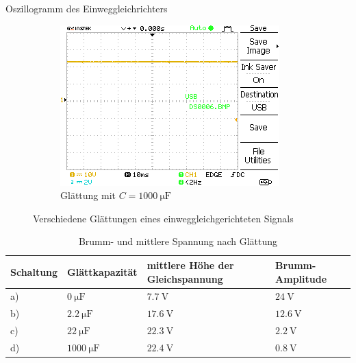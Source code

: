 \documentclass{article}
\theoremstyle{definition}
\begin{document}
\begin{aufgabe}{Oszillogramm des Einweggleichrichters}
\begin{figure}[H]
\begin{subfigure}[b]{0.49 \textwidth}
            \includegraphics[width=\textwidth]{MesswerteVersuch2/DS0006.png}
            \caption{Glättung mit $C = \SI{1000}{\micro\farad}$}
            \label{a3_d}
        \end{subfigure}
        \caption{Verschiedene Glättungen eines einweggleichgerichteten Signals}
    \end{figure}
    \begin{table}[H]
        \centering
        \begin{tabular}{|l|l|l|l|}
            \hline
            Schaltung & Glättkapazität & mittlere Höhe der Gleichspannung & Brumm-Amplitude  \\
            \hline
            a) & $\SI{0}{\micro\farad}$ & $\SI{7.7}{\volt}$ & $\SI{24}{\volt}$ \\
            b) & $\SI{2.2}{\micro\farad}$ & $\SI{17.6}{\volt}$ & $\SI{12.6}{\volt}$ \\
            c) & $\SI{22}{\micro\farad}$ & $\SI{22.3}{\volt}$ & $\SI{2.2}{\volt}$ \\
            d) & $\SI{1000}{\micro\farad}$ & $\SI{22.4}{\volt}$ & $\SI{0.8}{\volt}$ \\
            \hline
        \end{tabular}
        \caption{Brumm- und mittlere Spannung nach Glättung}
    \end{table}
    \auswertung

\end{aufgabe}
\end{document}
